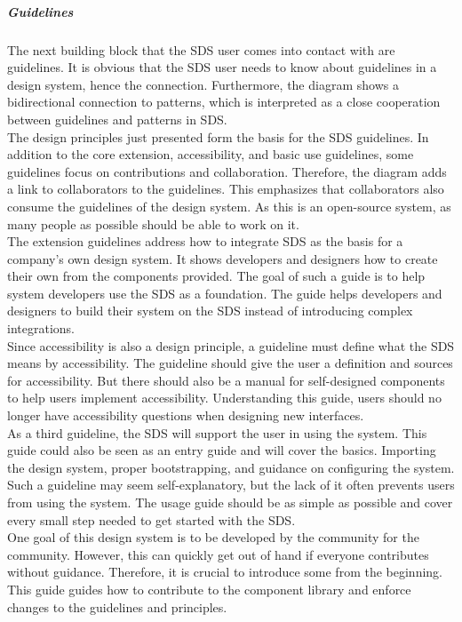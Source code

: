 \subparagraph{Guidelines}
The next building block that the SDS user comes into contact with are guidelines. It is obvious that the SDS user needs to know about guidelines in a design system, hence the connection. Furthermore, the diagram shows a bidirectional connection to patterns, which is interpreted as a close cooperation between guidelines and patterns in \ac{SDS}.\\
The design principles just presented form the basis for the \ac{SDS} guidelines. In addition to the core extension, accessibility, and basic use guidelines, some guidelines focus on contributions and collaboration. Therefore, the diagram adds a link to collaborators to the guidelines. This emphasizes that collaborators also consume the guidelines of the design system. As this is an open-source system, as many people as possible should be able to work on it. \\
The extension guidelines address how to integrate \ac{SDS} as the basis for a company's own design system. It shows developers and designers how to create their own from the components provided. The goal of such a guide is to help system developers use the SDS as a foundation. The guide helps developers and designers to build their system on the SDS instead of introducing complex integrations. \\
Since accessibility is also a design principle, a guideline must define what the \ac{SDS} means by accessibility. The guideline should give the user a definition and sources for accessibility. But there should also be a manual for self-designed components to help users implement accessibility. Understanding this guide, users should no longer have accessibility questions when designing new interfaces. \\
As a third guideline, the \ac{SDS} will support the user in using the system. This guide could also be seen as an entry guide and will cover the basics. Importing the design system, proper bootstrapping, and guidance on configuring the system. Such a guideline may seem self-explanatory, but the lack of it often prevents users from using the system. The usage guide should be as simple as possible and cover every small step needed to get started with the \ac{SDS}. \\
One goal of this design system is to be developed by the community for the community. However, this can quickly get out of hand if everyone contributes without guidance. Therefore, it is crucial to introduce some from the beginning. This guide guides how to contribute to the component library and enforce changes to the guidelines and principles. \\
